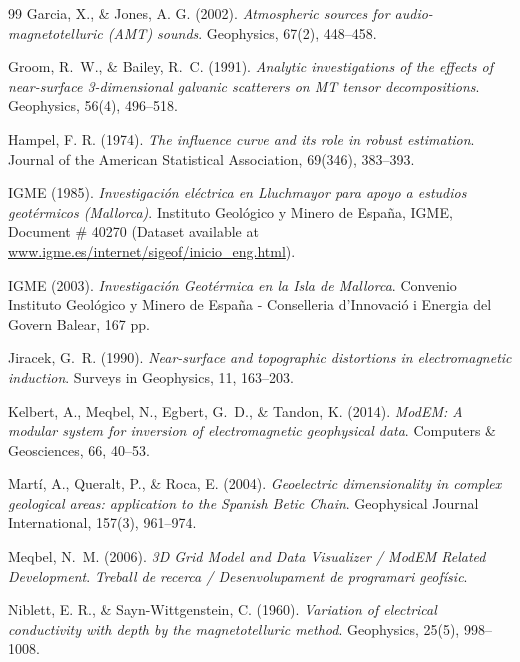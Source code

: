 \documentclass[11pt,a4paper,oneside]{article}
\begin{document}
\begin{thebibliography}{99}
 Garcia, X., \& Jones, A. G. (2002).
  \textit{Atmospheric sources for audio-magnetotelluric (AMT) sounds}.
  Geophysics, 67(2), 448--458.

 Groom, R.~W., \& Bailey, R.~C. (1991).
  \textit{Analytic investigations of the effects of near-surface 3-dimensional galvanic scatterers on MT tensor decompositions}.
  Geophysics, 56(4), 496--518.

 Hampel, F. R. (1974).
  \textit{The influence curve and its role in robust estimation}.
  Journal of the American Statistical Association, 69(346), 383--393.

 IGME (1985).
  \textit{Investigación eléctrica en Lluchmayor para apoyo a estudios geotérmicos (Mallorca)}.
  Instituto Geológico y Minero de España, IGME, Document \# 40270 (Dataset available at \url{www.igme.es/internet/sigeof/inicio_eng.html}).

 IGME (2003).
  \textit{Investigación Geotérmica en la Isla de Mallorca}.
  Convenio Instituto Geológico y Minero de España - Conselleria d’Innovació i Energia del Govern Balear, 167 pp.

 Jiracek, G.~R. (1990).
  \textit{Near-surface and topographic distortions in electromagnetic induction}.
  Surveys in Geophysics, 11, 163--203.

 Kelbert, A., Meqbel, N., Egbert, G.~D., \& Tandon, K. (2014).
  \textit{ModEM: A modular system for inversion of electromagnetic geophysical data}.
  Computers \& Geosciences, 66, 40--53.

 Mart\'i, A., Queralt, P., \& Roca, E. (2004).
  \textit{Geoelectric dimensionality in complex geological areas: application to the Spanish Betic Chain}.
  Geophysical Journal International, 157(3), 961--974.

 Meqbel, N.~M. (2006).
  \textit{3D Grid Model and Data Visualizer / ModEM Related Development}.
  \textsl{Treball de recerca / Desenvolupament de programari geofísic}.

 Niblett, E. R., \& Sayn-Wittgenstein, C. (1960).
  \textit{Variation of electrical conductivity with depth by the magnetotelluric method}.
  Geophysics, 25(5), 998--1008.


\end{thebibliography}
\end{document}
